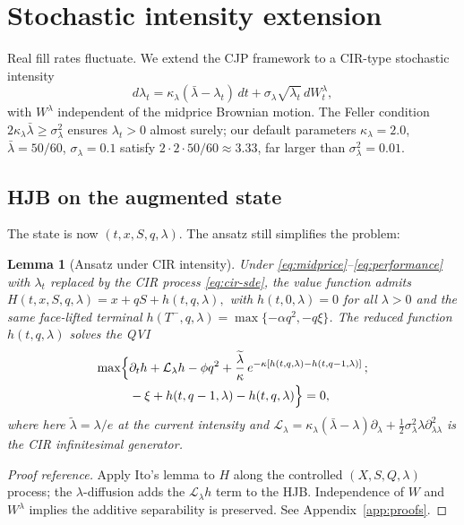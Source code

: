\documentclass[]{interact}
\theoremstyle{plain}
\newtheorem{lemma}[theorem]{Lemma}
\theoremstyle{definition}
\theoremstyle{remark}
\newcommand{\1}[1]{\mathbf{1}_{\{#1\}}}
\newcommand{\ltil}{\widetilde{\lambda}}
\begin{document}
\section{Stochastic intensity extension}\label{sec:cir}

Real fill rates fluctuate. We extend the CJP framework to a CIR-type stochastic intensity \citep{coxingersollross1985,andersen2008heston}
\begin{equation}\label{eq:cir-sde}
d\lambda_t = \kappa_\lambda (\bar\lambda - \lambda_t)\, dt + \sigma_\lambda \sqrt{\lambda_t}\, dW^\lambda_t,
\end{equation}
with $W^\lambda$ independent of the midprice Brownian motion. The Feller condition $2 \kappa_\lambda \bar\lambda \ge \sigma_\lambda^2$ ensures $\lambda_t > 0$ almost surely; our default parameters $\kappa_\lambda = 2.0$, $\bar\lambda = 50/60$, $\sigma_\lambda = 0.1$ satisfy $2 \cdot 2 \cdot 50/60 \approx 3.33$, far larger than $\sigma_\lambda^2=0.01$.

\subsection{HJB on the augmented state}\label{sec:cir-hjb}
The state is now $(t, x, S, q, \lambda)$. The ansatz still simplifies the problem:

\begin{lemma}[Ansatz under CIR intensity]\label{lem:cir-ansatz}
Under \eqref{eq:midprice}--\eqref{eq:performance} with $\lambda_t$ replaced by the CIR process \eqref{eq:cir-sde}, the value function admits
$
H(t,x,S,q,\lambda) = x + q S + h(t,q,\lambda),
$
with $h(t, 0, \lambda) = 0$ for all $\lambda > 0$ and the same face-lifted terminal $h(T^-, q, \lambda) = \max\{-\alpha q^2,-q\xi\}$. The reduced function $h(t,q,\lambda)$ solves the QVI
\begin{equation}\label{eq:cir-qvi}
\begin{split}
\max\Bigl\{
&\partial_t h + \mathcal{L}_\lambda h - \phi q^2 + \frac{\ltil}{\kappa}\, e^{-\kappa[h(t,q,\lambda) - h(t,q-1,\lambda)]}\,;\\
&-\xi + h(t,q-1,\lambda) - h(t,q,\lambda) \Bigr\} = 0,
\end{split}
\end{equation}
where here $\ltil=\lambda/e$ at the current intensity and $\mathcal{L}_\lambda = \kappa_\lambda(\bar\lambda - \lambda) \partial_\lambda + \tfrac{1}{2} \sigma_\lambda^2 \lambda \partial^2_{\lambda\lambda}$ is the CIR infinitesimal generator.
\end{lemma}
\begin{proof}[Proof reference]
Apply Ito's lemma to $H$ along the controlled $(X, S, Q, \lambda)$ process; the $\lambda$-diffusion adds the $\mathcal{L}_\lambda h$ term to the HJB. Independence of $W$ and $W^\lambda$ implies the additive separability is preserved. See Appendix~\ref{app:proofs}.
\end{proof}
\end{document}
